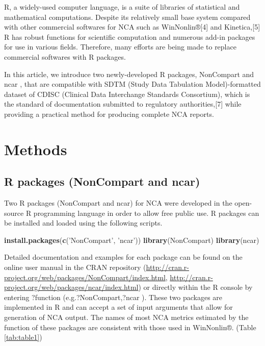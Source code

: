 \documentclass[12pt,]{krantz}
\newenvironment{Shaded}{\begin{snugshade}}{\end{snugshade}}
\newcommand{\KeywordTok}[1]{\textcolor[rgb]{0.13,0.29,0.53}{\textbf{#1}}}
\newcommand{\StringTok}[1]{\textcolor[rgb]{0.31,0.60,0.02}{#1}}
\newcommand{\NormalTok}[1]{#1}
\theoremstyle{definition}
\theoremstyle{definition}
\theoremstyle{definition}
\theoremstyle{remark}
\begin{document}
R, a widely-used computer language, is a suite of libraries of
statistical and mathematical computations. \citep{R-base} Despite its
relatively small base system compared with other commercial softwares
for NCA such as WinNonlin®{[}4{]} and Kinetica,{[}5{]} R has robust
functions for scientific computation and numerous add-in packages for
use in various fields. \citep{kim2015r} Therefore, many efforts are
being made to replace commercial softwares with R packages.

In this article, we introduce two newly-developed R packages, NonCompart
\citep{R-NonCompart} and ncar \citep{R-ncar}, that are compatible with
SDTM (Study Data Tabulation Model)-formatted dataset of CDISC (Clinical
Data Interchange Standards Consortium), which is the standard of
documentation submitted to regulatory authorities,{[}7{]} while
providing a practical method for producing complete NCA reports.

\chapter{Methods}\label{methods}

\section{R packages (NonCompart and
ncar)}\label{r-packages-noncompart-and-ncar}

Two R packages (NonCompart and ncar) for NCA were developed in the
open-source R programming language in order to allow free public use. R
packages can be installed and loaded using the following scripts.

\begin{Shaded}
\begin{Highlighting}[]
\KeywordTok{install.packages}\NormalTok{(}\KeywordTok{c}\NormalTok{(}\StringTok{'NonCompart'}\NormalTok{, }\StringTok{'ncar'}\NormalTok{))}
\KeywordTok{library}\NormalTok{(NonCompart)}
\KeywordTok{library}\NormalTok{(ncar)}
\end{Highlighting}
\end{Shaded}

Detailed documentation and examples for each package can be found on the
online user manual in the CRAN repository
(\url{http://cran.r-project.org/web/packages/NonCompart/index.html},
\url{http://cran.r-project.org/web/packages/ncar/index.html}) or
directly within the R console by entering ?function
(e.g.?NonCompart,?ncar ). These two packages are implemented in R and
can accept a set of input arguments that allow for generation of NCA
output. The names of most NCA metrics estimated by the function of these
packages are consistent with those used in WinNonlin®. (Table
\ref{tab:table1})
\end{document}
